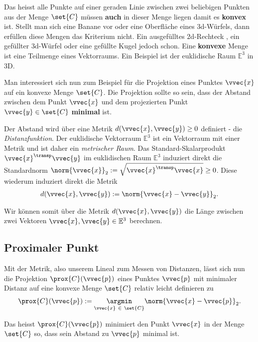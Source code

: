 \documentclass[
  12pt,
  british,
  paper=a4,
  twoside,
  titlepage=true,
  openright,
  abstract=on,
  toc=listofnumbered,
  numbers=noenddot,
  chapterprefix=true,
  headings=optiontohead,
  svgnames,
  dvipsnames]{scrreprt}
\begin{document}
Das heisst alle Punkte auf einer geraden Linie zwischen zwei beliebigen
Punkten aus der Menge \(\set{C}\) müssen \textbf{auch} in dieser Menge
liegen damit es \textbf{konvex} ist. Stellt man sich eine Banane vor
oder eine Oberfläche eines \(3\)d-Würfels, dann erfüllen diese Mengen
das Kriterium nicht. Ein ausgefülltes \(2\)d-Rechteck , ein gefüllter
\(3\)d-Würfel oder eine gefüllte Kugel jedoch schon. Eine
\textbf{konvexe} Menge ist eine Teilmenge eines Vektorraums. Ein
Beispiel ist der euklidische Raum \(\mathbb{E}^3\) in \(3\)D.

Man interessiert sich nun zum Beispiel für die Projektion eines Punktes
\(\vvec{x}\) auf ein konvexe Menge \(\set{C}\). Die Projektion sollte so
sein, dass der Abstand zwischen dem Punkt \(\vvec{x}\) und dem
projezierten Punkt \(\vvec{y} \in \set{C}\) \textbf{minimal} ist.

Der Abstand wird über eine Metrik \(d(\vvec{x},\vvec{y}) \geq 0\)
definiert - die \emph{Distanzfunktion}. Der euklidische Vektorraum
\(\mathbb{E}^3\) ist ein Vektorraum mit einer Metrik und ist daher ein
\emph{metrischer Raum}. Das Standard-Skalarprodukt
\(\vvec{x}^\transp \vvec{y}\) im euklidischen Raum \(\mathbb{E}^3\)
induziert direkt die Standardnorm
\(\norm{\vvec{x}}_2 := \sqrt{\vvec{x}^\transp \vvec{x}} \geq 0\). Diese
wiederum induziert direkt die Metrik
\begin{align} d(\vvec{x},\vvec{y}) := \norm{\vvec{x} - \vvec{y}}_2. \end{align}

Wir können somit über die Metrik \(d(\vvec{x},\vvec{y})\) die Länge
zwischen zwei Vektoren \(\vvec{x},\vvec{y} \in \mathbb{E}^3\) berechnen.

\hypertarget{proximaler-punkt}{%
\subsection{Proximaler Punkt}\label{proximaler-punkt}}

Mit der Metrik, also unserem Lineal zum Messen von Distanzen, lässt sich
nun die Projektion \(\prox{C}(\vvec{p})\) eines Punktes \(\vvec{p}\) mit
minimaler Distanz auf eine konvexe Menge \(\set{C}\) relativ leicht
definieren zu
\begin{align} \prox{C}(\vvec{p}) :=  \underset{\vvec{x} \ \in \ \set{C}}{\argmin} \norm{\vvec{x} - \vvec{p}}_2. \end{align}

Das heisst \(\prox{C}(\vvec{p})\) minimiert den Punkt \(\vvec{x}\) in
der Menge \(\set{C}\) so, dass sein Abstand zu \(\vvec{p}\) minimal ist.
\end{document}
